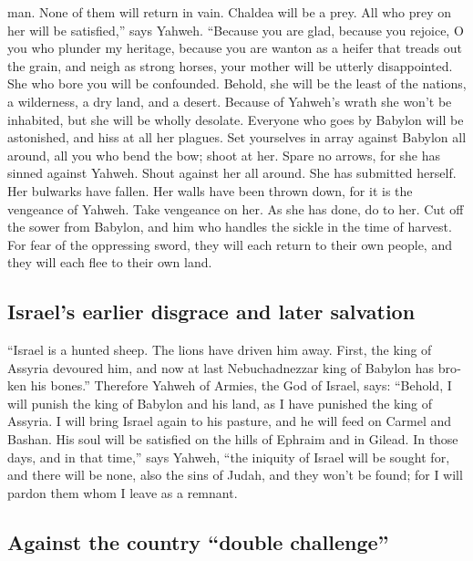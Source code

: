 \begin{paracol}{2}
\begin{otherlanguage}{english}
man. None of them will return in vain.  Chaldea will be a
prey. All who prey on her will be satisfied,'' says Yahweh.
 ``Because you are glad, because you rejoice, O you who
plunder my heritage, because you are wanton as a heifer that treads out
the grain, and neigh as strong horses,  your mother will
be utterly disappointed. She who bore you will be confounded. Behold,
she will be the least of the nations, a wilderness, a dry land, and a
desert.  Because of Yahweh's wrath she won't be
inhabited, but she will be wholly desolate. Everyone who goes by Babylon
will be astonished, and hiss at all her plagues.  Set
yourselves in array against Babylon all around, all you who bend the
bow; shoot at her. Spare no arrows, for she has sinned against Yahweh.
 Shout against her all around. She has submitted herself.
Her bulwarks have fallen. Her walls have been thrown down, for it is the
vengeance of Yahweh. Take vengeance on her. As she has done, do to her.
 Cut off the sower from Babylon, and him who handles the
sickle in the time of harvest. For fear of the oppressing sword, they
will each return to their own people, and they will each flee to their
own land.

\hypertarget{israels-earlier-disgrace-and-later-salvation}{%
\subsection{Israel's earlier disgrace and later
salvation}\label{israels-earlier-disgrace-and-later-salvation}}

 ``Israel is a hunted sheep. The lions have driven him
away. First, the king of Assyria devoured him, and now at last
Nebuchadnezzar king of Babylon has broken his bones.'' 
Therefore Yahweh of Armies, the God of Israel, says: ``Behold, I will
punish the king of Babylon and his land, as I have punished the king of
Assyria.  I will bring Israel again to his pasture, and
he will feed on Carmel and Bashan. His soul will be satisfied on the
hills of Ephraim and in Gilead.  In those days, and in
that time,'' says Yahweh, ``the iniquity of Israel will be sought for,
and there will be none, also the sins of Judah, and they won't be found;
for I will pardon them whom I leave as a remnant.

\hypertarget{against-the-country-double-challenge}{%
\subsection{Against the country ``double
challenge''}\label{against-the-country-double-challenge}}


\end{otherlanguage}
\end{paracol}
